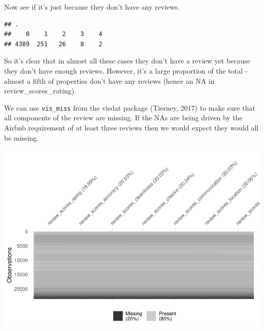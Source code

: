 \documentclass[
]{book}
\newenvironment{Shaded}{\begin{snugshade}}{\end{snugshade}}
\newcommand{\CommentTok}[1]{\textcolor[rgb]{0.56,0.35,0.01}{\textit{#1}}}
\newcommand{\KeywordTok}[1]{\textcolor[rgb]{0.13,0.29,0.53}{\textbf{#1}}}
\newcommand{\NormalTok}[1]{#1}
\newcommand{\OperatorTok}[1]{\textcolor[rgb]{0.81,0.36,0.00}{\textbf{#1}}}
\newcommand{\StringTok}[1]{\textcolor[rgb]{0.31,0.60,0.02}{#1}}
\begin{document}
Now see if it's just because they don't have any reviews.

\begin{Shaded}
\end{Shaded}

\begin{verbatim}
## .
##    0    1    2    3    4 
## 4389  251   26    8    2
\end{verbatim}

So it's clear that in almost all these cases they don't have a review yet because they don't have enough reviews. However, it's a large proportion of the total - almost a fifth of properties don't have any reviews (hence an NA in review\_scores\_rating).

We can use \texttt{vis\_miss} from the visdat package (Tierney, 2017) to make sure that all components of the review are missing. If the NAs are being driven by the Airbnb requirement of at least three reviews then we would expect they would all be missing.

\begin{Shaded}
\end{Shaded}

\includegraphics{telling_stories_with_data_files/figure-latex/unnamed-chunk-312-1.pdf}
\end{document}
